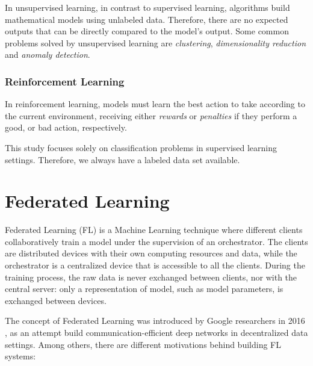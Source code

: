 In unsupervised learning, in contrast to supervised learning, algorithms build mathematical models using unlabeled data. Therefore, there are no expected outputs that can be directly compared to the model's output. Some common problems solved by unsupervised learning are \textit{clustering}, \textit{dimensionality reduction} and \textit{anomaly detection}.

\subsubsection{Reinforcement Learning}

In reinforcement learning, models must learn the best action to take according to the current environment, receiving either \textit{rewards} or \textit{penalties} if they perform a good, or bad action, respectively.

\bigskip

This study focuses solely on classification problems in supervised learning settings. Therefore, we always have a labeled data set available.

\section{Federated Learning}

Federated Learning (FL) is a Machine Learning technique where different clients collaboratively train a model under the supervision of an orchestrator. The clients are distributed devices with their own computing resources and data, while the orchestrator is a centralized device that is accessible to all the clients. During the training process, the raw data is never exchanged between clients, nor with the central server: only a representation of model, such as model parameters, is exchanged between devices.

The concept of Federated Learning was introduced by Google researchers in 2016 \cite{10.48550/arxiv.1602.05629}, as an attempt build communication-efficient deep networks in decentralized data settings. Among others, there are different motivations behind building FL systems:

